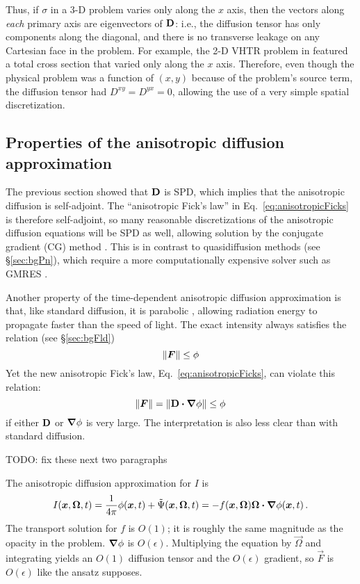 Thus, if $\sigma$ in a 3-D problem varies only along
the $x$ axis, then the vectors along \emph{each} primary axis are
eigenvectors of $\mathbf{D}$: i.e., the diffusion tensor has only
components along the diagonal, and there is no transverse leakage on any
Cartesian face in the problem. For example, the 2-D VHTR problem in
\cite{Lar2009c} featured a total cross section that varied only along the $x$
axis. Therefore, even though the physical problem was a function of $(x,y)$
because of the problem's source term, the diffusion tensor had
$D^{xy}=D^{yx}=0$, allowing the use of a very simple spatial discretization.

\subsection{Properties of the anisotropic diffusion approximation}

The previous section showed that $\mathbf{D}$ is SPD, which implies that the
anisotropic diffusion is self-adjoint. The ``anisotropic Fick's law''
in Eq.~\eqref{eq:anisotropicFicks} is therefore self-adjoint, so many reasonable
discretizations of the anisotropic diffusion equations will be SPD as well,
allowing
solution by the conjugate gradient (CG) method \cite{Tre1997}. This is in
contrast to quasidiffusion methods (see \S\ref{sec:bgPn}), which require a
more computationally expensive solver such as GMRES \cite{War2003}.

Another property of the time-dependent anisotropic diffusion approximation is that, like
standard diffusion, it is parabolic \cite{Pom1982,Ols2000}, allowing
radiation energy to propagate faster than the speed of light. The exact
intensity always satisfies the relation (see \S\ref{sec:bgFld})
\begin{equation*}
  \left\| \bm{F} \right\| \le \phi
\end{equation*}
Yet the new anisotropic Fick's law, Eq.~\eqref{eq:anisotropicFicks}, can violate
this relation:
\begin{equation*}
  \left\| \bm{F} \right\| = \left\| \mathbf{D} \bm{\cdot} \bm{\nabla} \phi \right\| \le \phi
\end{equation*}
if either $\mathbf{D}$ or $\bm{\nabla} \phi$ is very large. The interpretation is also
less clear than with standard diffusion.

TODO: fix these next two paragraphs

The anisotropic diffusion approximation for $I$ is
\begin{equation*}
I(\bm{x}, \bm{\Omega}, t)
=  \frac{1}{4\pi}\phi(\bm{x}, t) + \tilde\Psi(\bm{x}, \bm{\Omega}, t)
= - f(\bm{x}, \bm{\Omega}) \bm{\Omega}\bm{\cdot} \bm{\nabla} \phi(\bm{x}, t)\,.
\end{equation*}
The transport solution for $f$ is $O(1)$; it is roughly the
same magnitude as the opacity in the problem. $\bm{\nabla} \phi$ is $O(\epsilon)$.
Multiplying the equation by $\vec{\Omega}$ and integrating yields an $O(1)$
diffusion tensor and the $O(\epsilon)$ gradient, so $\vec{F}$ is $O(\epsilon)$
like the ansatz supposes.

